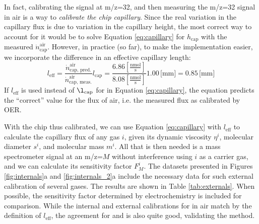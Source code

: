 In fact, calibrating the  signal at m/z=32, and then measuring the m/z=32 signal in air is a way to \textit{calibrate the chip capillary}. Since the real variation in the capillary flux is due to variation in the capillary height, the most correct way to account for it would be to solve Equation \ref{eq:capillary} for $h_\text{cap}$ with the measured $\dot{n}_\text{cap}^\text{air}$. However, in practice (so far), to make the implementation easier, we incorporate the difference in an effective capillary length:
\begin{equation}
l_\text{eff} = \frac{\dot{n}^{\text{air}}_\text{cap, pred.}}{\dot{n}^{\text{air}}_\text{cap, meas.}} l_\text{cap}= \frac{6.86 \left[\frac{\text{nmol}}{\text{s}}\right]}{8.08 \left[\frac{\text{nmol}}{\text{s}}\right]} 1.00\,\text{[mm]} = 0.85\,\text{[mm]}
\end{equation}
If $l_\text{eff}$ is used instead of $\l_\text{cap}$ for in Equation \ref{eq:capillary}, the equation predicts the ``correct'' value for the flux of air, i.e. the measured flux as calibrated by OER. 

With the chip thus calibrated, we can use Equation \ref{eq:capillary} with $l_\text{eff}$ to calculate the capillary flux of any gas $i$, given its dynamic viscosity $\eta^i$, molecular diameter $s^i$, and molecular mass $m^i$. All that is then needed is a mass spectrometer signal at an m/z=$M$ without interference using $i$ as a carrier gas, and we can calculate its sensitivity factor $F_M^i$. The datasets presented in Figures \ref{fig:internals}a and \ref{fig:internals_2}a include the necessary data for such external calibration of several gases. The results are shown in Table \ref{tab:externals}. When possible, the sensitivity factor determined by electrochemistry is included for comparison. While the internal and external calibrations for  in air match by the definition of $l_\text{eff}$, the agreement for  and  is also quite good, validating the method.

